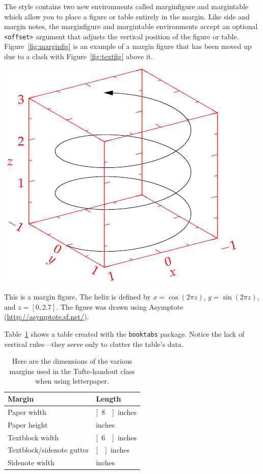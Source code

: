 \documentclass[a4paper]{tufte-handout} %
\begin{document}
The style contains two new environments called \textsf{marginfigure} and \textsf{margintable} which allow you to place a figure or table entirely in the margin. Like side and margin notes, the \textsf{marginfigure} and \textsf{margintable} environments accept an optional \texttt{<offset>} argument that adjusts the vertical position of the figure or table. Figure~\ref{fig:marginfig} is an example of a margin figure that has been moved up due to a clash with Figure~\ref{fig:textfig} above it.

\begin{marginfigure}[-0.75cm]
	\includegraphics[width=\linewidth]{helix.pdf}
	\caption{This is a margin figure. The helix is defined by $x = \cos(2\pi z)$, $y = \sin(2\pi z)$, and $z = [0, 2.7]$. The figure was drawn using Asymptote (\url{http://asymptote.sf.net/}).}
	\label{fig:marginfig}
\end{marginfigure}

Table~\ref{tab:normaltab} shows a table created with the \texttt{booktabs} package. Notice the lack of vertical rules---they serve only to clutter the table's data.

\begin{table}[ht]
	\centering
	\selectfont
	\begin{tabular}{l l}
		\toprule
		Margin & Length \\
		\midrule
		Paper width & \unit[8\nicefrac{1}{2}]{inches} \\
		Paper height & \unit[11]{inches} \\
		Textblock width & \unit[6\nicefrac{1}{2}]{inches} \\
		Textblock/sidenote gutter & \unit[\nicefrac{3}{8}]{inches} \\
		Sidenote width & \unit[2]{inches} \\
		\bottomrule
	\end{tabular}
	\caption{Here are the dimensions of the various margins used in the Tufte-handout class when using letterpaper.}
	\label{tab:normaltab}
\end{table}
\end{document}
